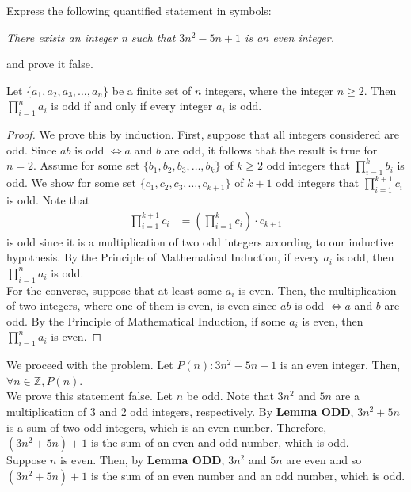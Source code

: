 \documentclass[12pt]{article}
\newcommand{\Z}{\mathbb{Z}}
\newenvironment{lemma}[2][Lemma]{\begin{trivlist}
		\item[\hskip \labelsep {\bfseries #1}\hskip \labelsep {\bfseries #2.}]}{\end{trivlist}}
\newenvironment{problem}[2][Problem]{\begin{trivlist}
		\item[\hskip \labelsep {\bfseries #1}\hskip \labelsep {\bfseries #2.}]}{\end{trivlist}}
\newenvironment{solution}[2][Solution]{\begin{trivlist}
		\item[\hskip \labelsep {\bfseries #1}\hskip \labelsep {\bfseries #2.}]}{\end{trivlist}}
\begin{document}
	\begin{problem}{13}
		Express the following quantified statement in symbols:
		\begin{center}
			\textit{There exists an integer n such that $3n^{2} -5n+1$ is an even integer.}
		\end{center}
		and prove it false.
		\begin{solution}{}
			\begin{lemma}{ODD}
				Let $\{a_{1},a_{2},a_{3},\ldots, a_{n}\}$ be a finite set of $n$ integers, where the integer $n\geq 2$. Then $\prod_{i=1}^{n} a_{i}$ is odd if and only if every integer $a_{i}$ is odd.
				\begin{proof}
					We prove this by induction. First, suppose that all integers considered are odd. Since $ab$ is odd $\iff a$ and $b$ are odd, it follows that the result is true for $n=2$. Assume for some set $\{b_{1},b_{2},b_{3},\ldots, b_{k}\}$ of  $k\geq 2$ odd integers that $\prod_{i=1}^{k} b_{i}$ is odd. We show for some set $\{c_{1},c_{2},c_{3},\ldots, c_{k+1}\}$ of $k+1$ odd integers that $\prod_{i=1}^{k+1} c_{i}$ is odd. Note that
					\begin{align*}
						\prod_{i=1}^{k+1} c_{i} &= \left(\prod_{i=1}^{k} c_{i}\right)\cdot c_{k+1} 
					\end{align*}
				is odd since it is a multiplication of two odd integers according to our inductive hypothesis. By the Principle of Mathematical Induction, if every $a_{i}$ is odd, then $\prod_{i=1}^{n} a_{i}$ is odd.\\
				
				For the converse, suppose that at least some $a_{i}$ is even. Then, the multiplication of two integers, where one of them is even, is even since $ab$ is odd $\iff a$ and $b$ are odd.  By the Principle of Mathematical Induction, if some $a_{i}$ is even, then $\prod_{i=1}^{n} a_{i}$ is even.
				\end{proof}
			\end{lemma}
		We proceed with the problem.
			Let $P(n): 3n^{2}-5n+1$ is an even integer. Then, \\ $\forall n\in \Z, P(n)$.\\
			
			We prove this statement false. Let $n$ be odd. Note that $3n^{2}$ and $5n$ are a multiplication of 3 and 2 odd integers, respectively. By \textbf{Lemma ODD}, $3n^{2} +5n$ is a sum of two odd integers, which is an even number. Therefore, $(3n^{2}+5n) +1 $ is the sum of an even and odd number, which is odd.\\
			
			Suppose $n$ is even. Then, by \textbf{Lemma ODD}, $3n^{2}$ and $5n$ are even and so $(3n^{2} + 5n) +1$ is the sum of an even number and an odd number, which is odd.
		\end{solution}
	\end{problem}
\end{document}
